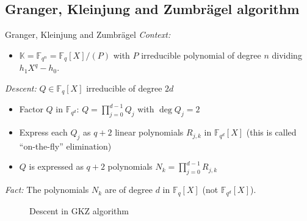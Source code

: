 \documentclass[xcolor=x11names,compress]{beamer}
\theoremstyle{break}
\theoremstyle{sc}
\theoremstyle{definition}
\theoremstyle{remark}
\begin{document}
\subsection{Granger, Kleinjung and Zumbrägel algorithm}

\begin{frame}{Granger, Kleinjung and Zumbrägel}
  \emph{Context:}
  \begin{itemize}
    \item $\mathbb{K}=\mathbb{F}_{q^n} = \mathbb{F}_q[X]/(P)$ with
  $P$ irreducible polynomial of degree $n$ dividing $h_1X^q-h_0$.
  \end{itemize}
  \emph{Descent:} $Q\in\mathbb{F}_q[X]$ irreducible of degree $2d$
  \begin{itemize}
    \item Factor $Q$ in $\mathbb{F}_{q^d}$: $Q=\prod_{j=0}^{d-1} Q_j$ with $\deg
      Q_j=2$
    \item Express each $Q_j$ as $q+2$ linear polynomials $R_{j,k}$ in
      $\mathbb{F}_{q^d}[X]$ (this is called ``on-the-fly'' elimination)
    \item $Q$ is expressed as $q+2$ polynomials $N_k = \prod_{j=0}^{d-1}R_{j,k}$
  \end{itemize}
  \emph{Fact:} The polynomials $N_k$ are of degree $d$ in $\mathbb{F}_{q}[X]$
  (not $\mathbb{F}_{q^d}[X]$).
\end{frame}

\begin{frame}
  \begin{figure}[here]
    \centering
   \caption{Descent in GKZ algorithm}
    \label{fig:gkz}
  \end{figure}
\end{frame}
\end{document}
